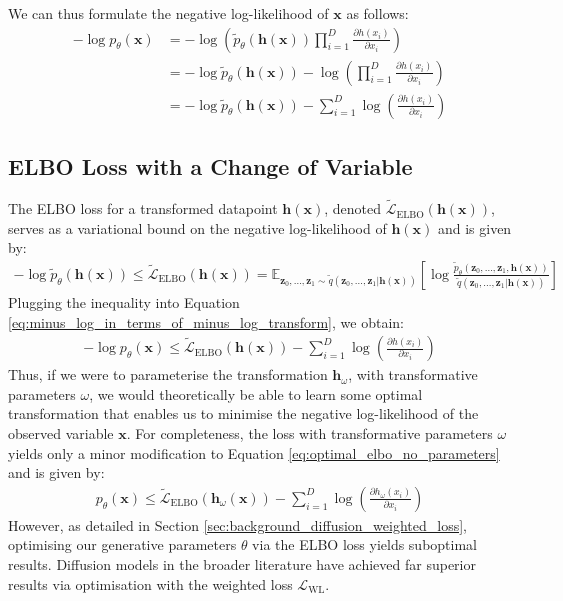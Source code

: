 \documentclass[ oneside,%
                    author={George Herbert},
                    degree={MSci},
                     title={Video Diffusion Models for Climate Simulations},
                  subtitle={}]{dissertation}
\begin{document}
We can thus formulate the negative log-likelihood of $\mathbf{x}$ as follows:
\begin{align}
      -\log p_\theta(\mathbf{x}) &= -\log \left(\tilde{p}_\theta(\mathbf{h}(\mathbf{x}))\prod_{i=1}^D\frac{\partial h(x_i)}{\partial x_i}\right)\\
      &= -\log \tilde{p}_\theta(\mathbf{h}(\mathbf{x})) - \log\left(\prod_{i=1}^D\frac{\partial h(x_i)}{\partial x_i}\right)\\
      &= -\log \tilde{p}_\theta(\mathbf{h}(\mathbf{x})) - \sum_{i=1}^D \log \left(\frac{\partial h(x_i)}{\partial x_i}\right)\label{eq:minus_log_in_terms_of_minus_log_transform}
\end{align}

\subsection{ELBO Loss with a Change of Variable}
\label{sec:results_elbo_change_of_variable}

The ELBO loss for a transformed datapoint $\mathbf{h}(\mathbf{x})$, denoted $\tilde{\mathcal{L}}_{\mathrm{ELBO}}(\mathbf{h}(\mathbf{x}))$, serves as a variational bound on the negative log-likelihood of $\mathbf{h}(\mathbf{x})$ and is given by:
\begin{align}
      -\log \tilde{p}_\theta(\mathbf{h}(\mathbf{x}))\le \tilde{\mathcal{L}}_{\mathrm{ELBO}}(\mathbf{h}(\mathbf{x})) = \mathbb{E}_{\mathbf{z}_0,\ldots,\mathbf{z}_1\sim\tilde{q}(\mathbf{z}_0,\ldots,\mathbf{z}_1|\mathbf{h}(\mathbf{x}))} \left[\log \frac{\tilde{p}_\theta(\mathbf{z}_0,\ldots,\mathbf{z}_1,\mathbf{h}(\mathbf{x}))}{\tilde{q}(\mathbf{z}_0,\ldots,\mathbf{z}_1|\mathbf{h}(\mathbf{x}))}\right]
\end{align}
Plugging the inequality into Equation \ref{eq:minus_log_in_terms_of_minus_log_transform}, we obtain:
\begin{align}
      -\log p_\theta(\mathbf{x})\le \tilde{\mathcal{L}}_{\mathrm{ELBO}}(\mathbf{h}(\mathbf{x})) - \sum_{i=1}^D \log \left(\frac{\partial h(x_i)}{\partial x_i}\right)\label{eq:optimal_elbo_no_parameters}
\end{align}
Thus, if we were to parameterise the transformation $\mathbf{h}_\omega$, with transformative parameters $\omega$, we would theoretically be able to learn some optimal transformation that enables us to minimise the negative log-likelihood of the observed variable $\mathbf{x}$. For completeness, the loss with transformative parameters $\omega$ yields only a minor modification to Equation \ref{eq:optimal_elbo_no_parameters} and is given by:
\begin{align}
      p_\theta(\mathbf{x}) \le \tilde{\mathcal{L}}_{\mathrm{ELBO}}(\mathbf{h}_\omega(\mathbf{x})) - \sum_{i=1}^D \log \left(\frac{\partial h_\omega(x_i)}{\partial x_i}\right)\label{eq:optimal_elbo_parameters}
\end{align}
However, as detailed in Section \ref{sec:background_diffusion_weighted_loss}, optimising our generative parameters $\theta$ via the ELBO loss yields suboptimal results. Diffusion models in the broader literature have achieved far superior results via optimisation with the weighted loss $\mathcal{L}_{\mathrm{WL}}$.
\end{document}
